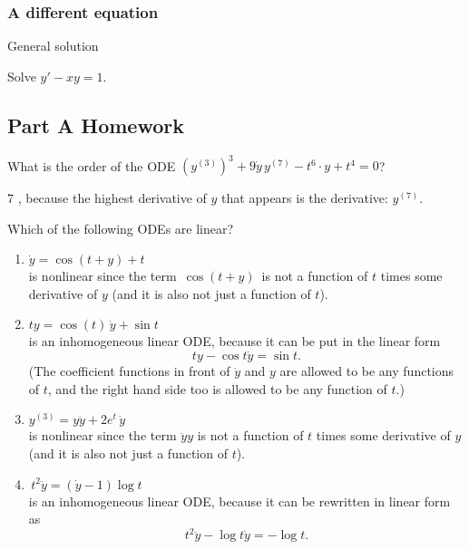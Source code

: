 \subsubsection{A different equation}
\begin{problem}
  General solution
\end{problem}
Solve $y' -xy = 1.$ 

\clearpage

\subsection{Part A Homework}
\begin{homework}
  What is the order of the ODE $(y^{(3)})^{3 } + 9 \dot y \,  y^{(7 )} -t^{6 }\cdot y + t^{4 } = 0$?\\
\end{homework}
7 , because the highest derivative of $y$ that appears is the derivative: $y^{(7)}.$

\begin{homework}
  Which of the following ODEs are linear?
\end{homework}
\begin{enumerate}
\item $\dot y = \cos (t+y) + t$ \\
  is nonlinear since the term $\, \cos (t+y)\,$
  is not a function of $t$ times some derivative of $y$ (and it is also not just a function of $t$).
\item $ty = \cos (t) \,  \dot y + \sin t$ \\
  is an inhomogeneous linear ODE, because it can be put in the linear form
  \begin{equation*}
    ty - \cos t \dot y = \sin t.
  \end{equation*}
  (The coefficient functions in front of $\dot{y}$ and $y$ are allowed to be any functions of $t$,
  and the right hand side too is allowed to be any function of $t$.)
\item $y^{(3)} = y \ddot y + 2e^ t \,  \dot y$ \\
  is nonlinear since the term $\ddot{y}y$ is not a function of
  $t$ times some derivative of $y$ (and it is also not just a function of $t$).
\item $\, t^2\ddot y = (\dot y-1)\log t\,$ \\
  is an inhomogeneous linear ODE, because it can be rewritten in linear form as
  \begin{equation*}
    t^2 \ddot y - \log t \dot y = -\log t.
  \end{equation*}
\end{enumerate}
\clearpage

